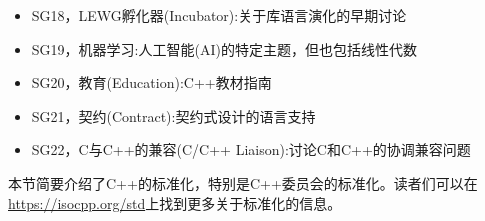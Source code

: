 \begin{itemize}
\item 
SG18，LEWG孵化器(Incubator):关于库语言演化的早期讨论

\item 
SG19，机器学习:人工智能(AI)的特定主题，但也包括线性代数

\item 
SG20，教育(Education):C++教材指南

\item 
SG21，契约(Contract):契约式设计的语言支持

\item 
SG22，C与C++的兼容(C/C++ Liaison):讨论C和C++的协调兼容问题
\end{itemize}

本节简要介绍了C++的标准化，特别是C++委员会的标准化。读者们可以在\url{https://isocpp.org/std}上找到更多关于标准化的信息。












